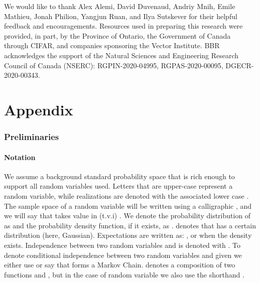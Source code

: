 \documentclass[final]{article}
\begin{document}
\begin{ack}
We would like to thank Alex Alemi, David Duvenaud, Andriy Mnih, Emile Mathieu, Jonah Philion, Yangjun Ruan, and Ilya Sutskever for their helpful feedback and encouragements.
Resources used in preparing this research were provided, in part, by the Province of Ontario, the Government of Canada through CIFAR, and companies sponsoring the Vector Institute.
BBR acknowledges the support of the Natural Sciences and Engineering Research Council of Canada (NSERC): RGPIN-2020-04995, RGPAS-2020-00095, DGECR-2020-00343.
\end{ack}
 



\clearpage
\newpage



\appendix
{} \part{Appendix} 



\parttoc 



\clearpage
\newpage


\section{Preliminaries}
\label{appx:preliminaries}


\subsection{Notation}
\label{appx:notation}



We assume a background standard probability space  that is rich enough to support all random variables used. 
Letters that are upper-case  represent a random variable, while realizations are denoted with the associated lower case . 
The sample space of a random variable will be written using a calligraphic , and we will say that  takes value in (t.v.i) .
We denote the probability distribution of  as  and the probability density function, if it exists, as .
 denotes that  has a certain distribution (here, Gaussian).
Expectations are written as: , or  when the density exists.
Independence between two random variables  and  is denoted with .
To denote conditional independence between two random variables  and  given  we either use  or say that  forms a Markov Chain. 
 denotes a composition of two functions  and , but in the case of random variable we also use the shorthand .
\end{document}
